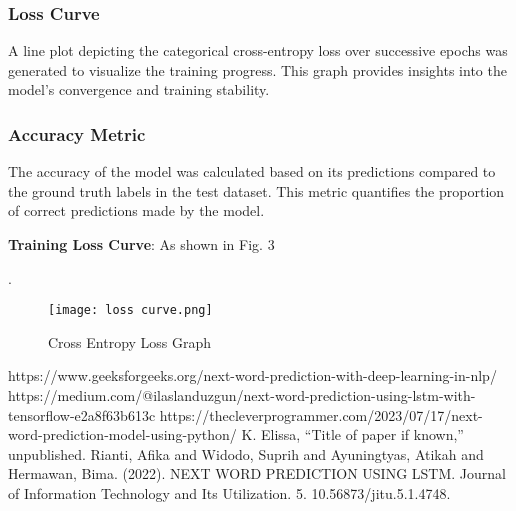 \documentclass[conference]{IEEEtran}
\begin{document}
\subsubsection{\textbf{Loss Curve}}
 A line plot depicting the categorical cross-entropy loss over successive epochs was generated to visualize the training progress. This graph provides insights into the model's convergence and training stability.
\subsubsection{\textbf{Accuracy Metric}}
The accuracy of the model was calculated based on its predictions compared to the ground truth labels in the test dataset. This metric quantifies the proportion of correct predictions made by the model.




\textbf{Training Loss Curve}: 
As shown in Fig. 3

.
\begin{figure}
    \centering
    \texttt{[image: loss curve.png]}
    \caption{Cross Entropy Loss Graph}
    \label{fig:enter-label}
\end{figure}
 
\begin{thebibliography}{00}
https://www.geeksforgeeks.org/next-word-prediction-with-deep-learning-in-nlp/
https://medium.com/@ilaslanduzgun/next-word-prediction-using-lstm-with-tensorflow-e2a8f63b613c
 https://thecleverprogrammer.com/2023/07/17/next-word-prediction-model-using-python/
 K. Elissa, ``Title of paper if known,'' unpublished.
 Rianti, Afika and Widodo, Suprih and Ayuningtyas, Atikah and Hermawan, Bima. (2022). NEXT WORD PREDICTION USING LSTM. Journal of Information Technology and Its Utilization. 5. 10.56873/jitu.5.1.4748.

\end{thebibliography}
\end{document}
